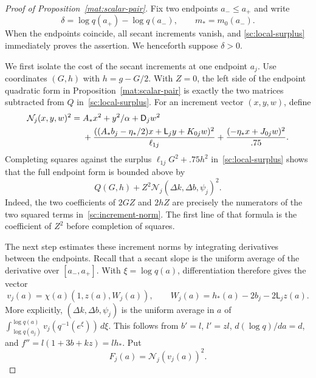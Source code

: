 \begin{proof}[Proof of Proposition~\ref{mat:scalar-pair}]
Fix two endpoints $a_-\le a_+$ and write
\[
 \delta=\log q(a_+)-\log q(a_-),\qquad m_*=m_0(a_-).
\]
When the endpoints coincide, all secant increments vanish, and
\eqref{sc:local-surplus} immediately proves the assertion.
We henceforth suppose $\delta>0$.

We first isolate the cost of the secant increments at one endpoint $a_j$.
Use coordinates $(G,h)$ with $h=g-G/2$.  With $Z=0$, the left side of
the endpoint quadratic form in Proposition~\ref{mat:scalar-pair} is
exactly the two matrices subtracted from $Q$ in~\eqref{sc:local-surplus}.
For an increment vector $(x,y,w)$, define
\begin{align}
 \mathcal N_j(x,y,w)^2={}&A_*x^2+y^2/\alpha+\mathsf D_jw^2\notag\\
 &+\frac{((A_*b_j-\eta_*/2)x+\mathsf L_jy+K_{0j}w)^2}{\ell_{1j}}
   +\frac{(-\eta_*x+J_{0j}w)^2}{.75}.
 \label{sc:increment-norm}
\end{align}
Completing squares against the surplus
$\ell_{1j}G^2+.75h^2$ in~\eqref{sc:local-surplus} shows that the full
endpoint form is bounded above by
\begin{equation}\label{sc:one-endpoint}
 Q(G,h)+Z^2\mathcal N_j(\Delta k,\Delta b,\psi_j)^2.
\end{equation}
Indeed, the two coefficients of $2GZ$ and $2hZ$ are precisely the
numerators of the two squared terms in~\eqref{sc:increment-norm}.
The first line of that formula is the coefficient of $Z^2$ before
completion of squares.

The next step estimates these increment norms by integrating derivatives
between the endpoints.  Recall that a secant slope is the uniform average
of the derivative over $[a_-,a_+]$.  With $\xi=\log q(a)$, differentiation
therefore gives the vector
\begin{equation}\label{sc:derivative-vector}
 v_j(a)=\chi(a)(1,z(a),W_j(a)),\qquad
 W_j(a)=h_*(a)-2b_j-2\mathsf L_jz(a).
\end{equation}
More explicitly, $(\Delta k,\Delta b,\psi_j)$ is the uniform average in
$a$ of $\int_{\log q(a_j)}^{\log q(a)}v_j(q^{-1}(e^\xi))\,d\xi$.
This follows from $b'=l$, $l'=zl$, $d(\log q)/da=d$, and
$f''=l(1+3b+kz)=lh_*$.
Put
\[
 F_j(a)=\mathcal N_j(v_j(a))^2.
\]


\end{proof}
